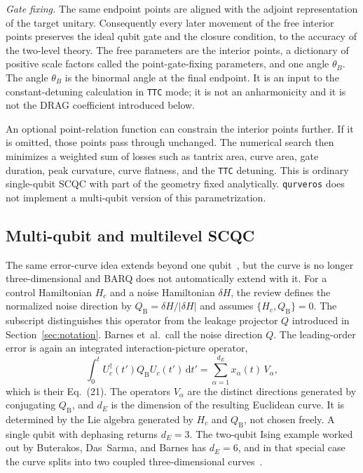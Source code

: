 \documentclass[11pt,a4paper]{article}
\theoremstyle{definition}
\newcommand{\abs}[1]{\lvert #1\rvert}
\newcommand{\dd}{\mathrm{d}}
\begin{document}
\emph{Gate fixing.}  The same endpoint points are aligned with the adjoint
representation of the target unitary.  Consequently every later movement of the
free interior points preserves the ideal qubit gate and the closure condition,
to the accuracy of the two-level theory.  The free parameters are the interior
points, a dictionary of positive scale factors called the point-gate-fixing
parameters, and one angle \(\theta_B\).  The angle \(\theta_B\) is the
binormal angle at the final endpoint.  It is an input to the constant-detuning
calculation in \texttt{TTC} mode; it is not an anharmonicity and it is not the
DRAG coefficient introduced below.

An optional point-relation function can constrain the interior points further.
If it is omitted, those points pass through unchanged.  The numerical search
then minimizes a weighted sum of losses such as tantrix area, curve area, gate
duration, peak curvature, curve flatness, and the \texttt{TTC} detuning.  This
is ordinary single-qubit SCQC with part of the geometry fixed analytically.
\texttt{qurveros} does not implement a multi-qubit version of this
parametrization.

\subsection{Multi-qubit and multilevel SCQC}
\label{sec:scqc-multi}

The same error-curve idea extends beyond one qubit~\cite{Buterakos2021,BarnesReview},
but the curve is no longer three-dimensional and BARQ does not automatically
extend with it.  For a control Hamiltonian \(H_c\) and a noise Hamiltonian
\(\delta H\), the review defines the normalized noise direction by
\(Q_{\mathrm{B}}=\delta H/\abs{\delta H}\) and assumes
\(\{H_c,Q_{\mathrm{B}}\}=0\).  The subscript distinguishes this operator from
the leakage projector \(Q\) introduced in Section~\ref{sec:notation}.  Barnes
et~al.\ call the noise direction \(Q\).  The leading-order error is again an
integrated interaction-picture operator,
\begin{equation}
\label{eq:multi-curve}
  \int_0^t U_c^\dagger(t')Q_{\mathrm{B}}U_c(t')\,\dd t'
  =\sum_{\alpha=1}^{d_E} x_\alpha(t)\,V_\alpha,
\end{equation}
which is their Eq.~(21).  The operators \(V_\alpha\) are the distinct
directions generated by conjugating \(Q_{\mathrm{B}}\), and \(d_E\) is the
dimension of the resulting Euclidean curve.  It is determined by the Lie
algebra generated by \(H_c\) and \(Q_{\mathrm{B}}\), not chosen freely.  A
single qubit with dephasing returns \(d_E=3\).  The two-qubit Ising example
worked out by Buterakos, Das~Sarma, and Barnes has \(d_E=6\), and in that
special case the curve splits into two coupled three-dimensional
curves~\cite{Buterakos2021}.
\end{document}
